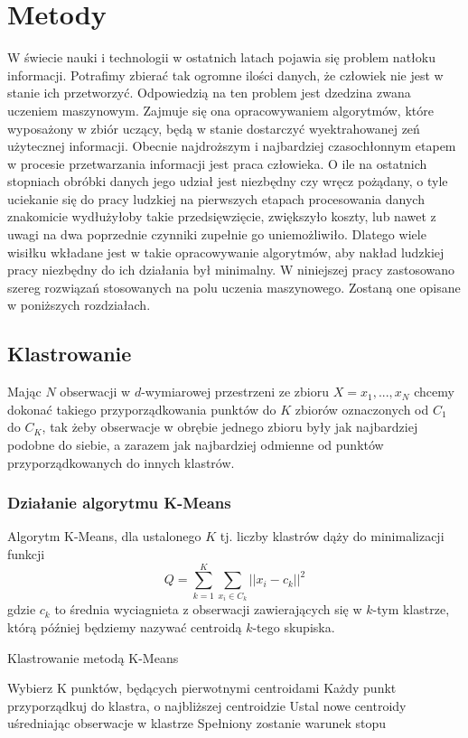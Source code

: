 \documentclass{article}
\begin{document}
\section{Metody}
W świecie nauki i technologii w ostatnich latach pojawia się problem natłoku informacji.
Potrafimy zbierać tak ogromne ilości danych, że człowiek nie jest w stanie ich przetworzyć.
Odpowiedzią na ten problem jest dzedzina zwana uczeniem maszynowym. 
Zajmuje się ona opracowywaniem algorytmów, które wyposażony w zbiór uczący, będą w stanie dostarczyć wyektrahowanej zeń użytecznej informacji.
Obecnie najdroższym i najbardziej czasochłonnym etapem w procesie przetwarzania informacji jest praca człowieka.
O ile na ostatnich stopniach obróbki danych jego udział jest niezbędny czy wręcz pożądany, o tyle uciekanie się do pracy ludzkiej na pierwszych etapach procesowania danych znakomicie wydłużyłoby takie przedsięwzięcie, zwiększyło koszty, lub nawet z uwagi na dwa poprzednie czynniki zupełnie go uniemożliwiło.
Dlatego wiele wisiłku wkładane jest w takie opracowywanie algorytmów, aby nakład ludzkiej pracy niezbędny do ich działania był minimalny.
W niniejszej pracy zastosowano szereg rozwiązań stosowanych na polu uczenia maszynowego.
Zostaną one opisane w poniższych rozdziałach.
\subsection{Klastrowanie}
Mając \(N\) obserwacji w \(d\)-wymiarowej przestrzeni ze zbioru \(X = {x_1, ..., x_N}\) chcemy dokonać takiego przyporządkowania punktów do \(K\) zbiorów oznaczonych od \(C_1\) do \(C_K\), tak żeby obserwacje w obrębie jednego zbioru były jak najbardziej podobne do siebie, a zarazem jak najbardziej odmienne od punktów przyporządkowanych do innych klastrów.\
\subsubsection{Działanie algorytmu K-Means}
Algorytm K-Means, dla ustalonego \(K\) tj. liczby klastrów dąży do minimalizacji funkcji 
\[Q = \sum\limits^K_{k=1}\sum\limits_{x_i \in C_k} ||x_i - c_k||^2\]
gdzie \(c_k\) to średnia wyciagnieta z obserwacji zawierających się w \(k\)-tym klastrze, którą później będziemy nazywać centroidą $k$-tego skupiska.

\begin{algorithm}
\label{class_kmeans_alg}
\caption{Klastrowanie metodą K-Means}
\begin{algorithmic}[1]
\STATE Wybierz K punktów, będących pierwotnymi centroidami
\REPEAT
\STATE Każdy punkt przyporządkuj do klastra, o najbliższej centroidzie
\STATE Ustal nowe centroidy uśredniając obserwacje w klastrze
\UNTIL Spełniony zostanie warunek stopu
\end{algorithmic}
\end{algorithm}	
\end{document}
